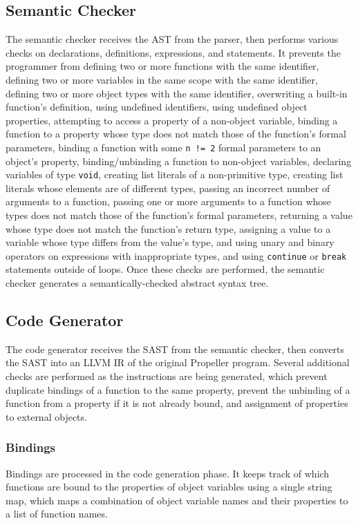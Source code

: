 \subsection{Semantic Checker}
The semantic checker receives the AST from the parser, then performs various checks
on declarations, definitions, expressions, and statements. It prevents the programmer from
defining two or more functions with the same identifier, defining two or more
variables in the same scope with the same identifier, defining two or more object
types with the same identifier, overwriting a built-in function's definition,
using undefined identifiers, using undefined object properties, attempting to
access a property of a non-object variable, binding a function to a property
whose type does not match those of the function's formal parameters, binding a
function with some \texttt{n != 2} formal parameters to an object's property,
binding/unbinding a function to non-object variables, declaring variables of type
\texttt{void}, creating list literals of a non-primitive type, creating list
literals whose elements are of different types, passing an incorrect number of
arguments to a function, passing one or more arguments to a function whose types
does not match those of the function's formal parameters, returning a value whose
type does not match the function's return type, assigning a value to a variable
whose type differs from the value's type, and using unary and binary operators on
expressions with inappropriate types, and using \texttt{continue} or
\texttt{break} statements outside of loops. Once these checks are performed, the
semantic checker generates a semantically-checked abstract syntax tree.

\subsection{Code Generator}
The code generator receives the SAST from the semantic checker, then converts
the SAST into an LLVM IR of the original Propeller program. Several additional
checks are performed as the instructions are being generated, which prevent
duplicate bindings of a function to the same property, prevent the unbinding
of a function from a property if it is not already bound, and assignment of
properties to external objects. 

\subsubsection{Bindings}
Bindings are processed in the code generation phase. It
keeps track of which functions are bound to the properties of object
variables using a single string map, which maps a combination of object
variable names and their properties to a list of function names.

